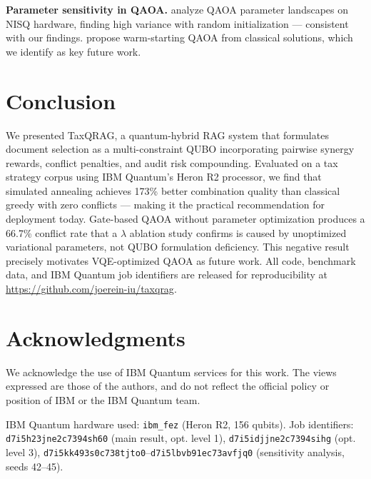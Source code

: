 \documentclass{article}
\begin{document}
\textbf{Parameter sensitivity in QAOA.} \citet{shaydulin2023qaoa}
analyze QAOA parameter landscapes on NISQ hardware, finding high
variance with random initialization — consistent with our findings.
\citet{warmstart2021} propose warm-starting QAOA from classical
solutions, which we identify as key future work.

\section{Conclusion}
\label{sec:conclusion}

We presented TaxQRAG, a quantum-hybrid RAG system that formulates
document selection as a multi-constraint QUBO incorporating pairwise
synergy rewards, conflict penalties, and audit risk compounding.
Evaluated on a tax strategy corpus using IBM Quantum's Heron R2
processor, we find that simulated annealing achieves 173\% better
combination quality than classical greedy with zero conflicts —
making it the practical recommendation for deployment today. Gate-based
QAOA without parameter optimization produces a 66.7\% conflict rate
that a $\lambda$ ablation study confirms is caused by unoptimized
variational parameters, not QUBO formulation deficiency. This negative
result precisely motivates VQE-optimized QAOA as future work. All code,
benchmark data, and IBM Quantum job identifiers are released for
reproducibility at \url{https://github.com/joerein-iu/taxqrag}.

\section*{Acknowledgments}

We acknowledge the use of IBM Quantum services for this work. The views
expressed are those of the authors, and do not reflect the official
policy or position of IBM or the IBM Quantum team.

IBM Quantum hardware used: \texttt{ibm\_fez} (Heron R2, 156 qubits).
Job identifiers: \texttt{d7i5h23jne2c7394sh60} (main result, opt.
level 1), \texttt{d7i5idjjne2c7394sihg} (opt. level 3),
\texttt{d7i5kk493s0c738tjto0}–\texttt{d7i5lbvb91ec73avfjq0}
(sensitivity analysis, seeds 42–45).
\end{document}
